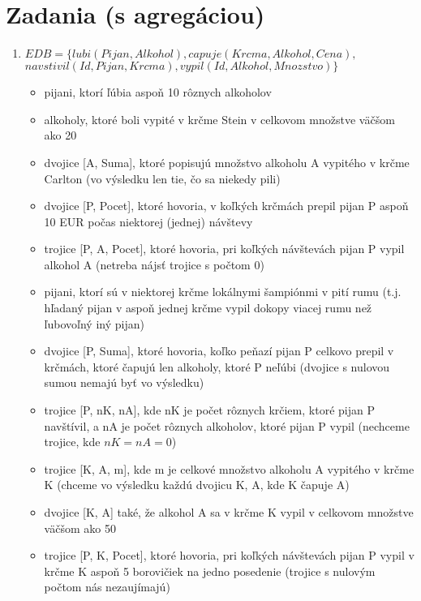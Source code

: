 \documentclass[10pt, a4paper]{article}
\theoremstyle{definition}
\begin{document}
\section{Zadania (s agregáciou)}

\begin{enumerate}

\item $EDB=\{lubi(Pijan, Alkohol), capuje(Krcma, Alkohol, Cena),$\\
\hspace*{1cm} $navstivil(Id, Pijan, Krcma), vypil(Id, Alkohol, Mnozstvo)\}$
\begin{itemize}
    \item pijani, ktorí ľúbia aspoň 10 rôznych alkoholov
    \item alkoholy, ktoré boli vypité v krčme Stein v celkovom množstve väčšom ako 20
    \item dvojice [A, Suma], ktoré popisujú množstvo alkoholu A vypitého v krčme Carlton (vo výsledku len tie, čo sa niekedy pili)
    \item dvojice [P, Pocet], ktoré hovoria, v koľkých krčmách prepil pijan P aspoň 10 EUR počas niektorej (jednej) návštevy
    \item trojice [P, A, Pocet], ktoré hovoria, pri koľkých návštevách pijan P vypil alkohol A (netreba nájsť trojice s počtom 0)
    \item pijani, ktorí sú v niektorej krčme lokálnymi šampiónmi v pití rumu (t.j. hľadaný pijan v aspoň jednej krčme vypil dokopy viacej rumu než ľubovoľný iný pijan)
    \item dvojice [P, Suma], ktoré hovoria, koľko peňazí pijan P celkovo prepil v krčmách, ktoré čapujú len alkoholy, ktoré P neľúbi (dvojice s nulovou sumou nemajú byť vo výsledku)
    \item trojice [P, nK, nA], kde nK je počet rôznych krčiem, ktoré pijan P navštívil, a nA je počet rôznych alkoholov, ktoré pijan P vypil (nechceme trojice, kde $nK=nA=0$) 
    \item trojice [K, A, m], kde m je celkové množstvo alkoholu A vypitého v krčme K (chceme vo výsledku každú dvojicu K, A, kde K čapuje A)
    \item dvojice [K, A] také, že alkohol A sa v krčme K vypil v celkovom množstve väčšom ako 50
    \item trojice [P, K, Pocet], ktoré hovoria, pri koľkých návštevách pijan P vypil v krčme K aspoň 5 borovičiek na jedno posedenie (trojice s nulovým počtom nás nezaujímajú)

\end{itemize}
\end{enumerate}
\end{document}

